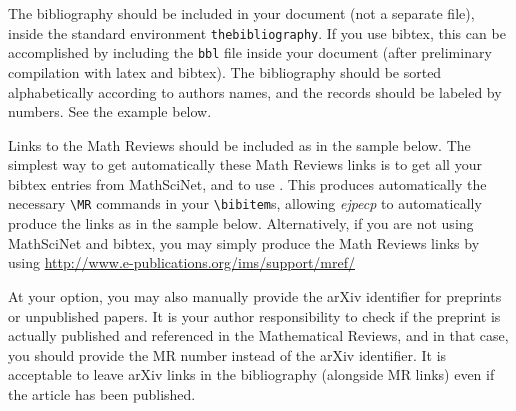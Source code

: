 \documentclass[ECP]{ejpecp} %
\begin{document}
The bibliography should be included in your document (not a separate file),
inside the standard environment \verb+thebibliography+. If you use bibtex,
this can be accomplished by including the \texttt{bbl} file inside your
document (after preliminary compilation with latex and bibtex). The
bibliography should be sorted alphabetically according to authors names, and
the records should be labeled by numbers. See the example below.

Links to the Math Reviews should be included as in the sample below. The
simplest way to get automatically these Math Reviews links is to get all your
bibtex entries from MathSciNet, and to use
\verb++. This produces automatically the necessary
\verb+\MR+ commands in your \verb+\bibitem+s, allowing \emph{ejpecp} to
automatically produce the links as in the sample below. Alternatively, if you
are not using MathSciNet and bibtex, you may simply produce the Math Reviews
links by using
\url{http://www.e-publications.org/ims/support/mref/}

At your option, you may also manually provide the arXiv identifier for
preprints or unpublished papers. It is your author responsibility to check if
the preprint is actually published and referenced in the Mathematical Reviews,
and in that case, you should provide the MR number instead of the arXiv
identifier. It is acceptable to leave arXiv links in the bibliography
(alongside MR links) even if the article has been published.



%
%

\end{document}
